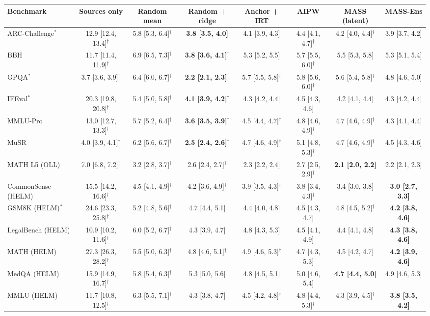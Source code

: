 \begin{tabular}{lccccccc}
\toprule
Benchmark & Sources only & Random mean & Random + ridge & Anchor + IRT & AIPW & MASS (latent) & MASS-Ens \\
\midrule
ARC-Challenge$^*$ & 12.9 [12.4, 13.4]$^\dagger$ & 5.8 [5.3, 6.4]$^\dagger$ & \textbf{3.8 [3.5, 4.0]} & 4.1 [3.9, 4.3] & 4.4 [4.1, 4.7]$^\dagger$ & 4.2 [4.0, 4.4]$^\dagger$ & 3.9 [3.7, 4.2] \\
BBH & 11.7 [11.4, 11.9]$^\dagger$ & 6.9 [6.5, 7.3]$^\dagger$ & \textbf{3.8 [3.6, 4.1]$^\dagger$} & 5.3 [5.2, 5.5] & 5.7 [5.5, 6.0]$^\dagger$ & 5.5 [5.3, 5.8] & 5.3 [5.1, 5.4] \\
GPQA$^*$ & 3.7 [3.6, 3.9]$^\dagger$ & 6.4 [6.0, 6.7]$^\dagger$ & \textbf{2.2 [2.1, 2.3]$^\dagger$} & 5.7 [5.5, 5.8]$^\dagger$ & 5.8 [5.6, 6.0]$^\dagger$ & 5.6 [5.4, 5.8]$^\dagger$ & 4.8 [4.6, 5.0] \\
IFEval$^*$ & 20.3 [19.8, 20.8]$^\dagger$ & 5.4 [5.0, 5.8]$^\dagger$ & \textbf{4.1 [3.9, 4.2]$^\dagger$} & 4.3 [4.2, 4.4] & 4.5 [4.3, 4.6] & 4.2 [4.1, 4.4] & 4.3 [4.2, 4.4] \\
MMLU-Pro & 13.0 [12.7, 13.3]$^\dagger$ & 5.7 [5.2, 6.4]$^\dagger$ & \textbf{3.6 [3.5, 3.9]$^\dagger$} & 4.5 [4.4, 4.7]$^\dagger$ & 4.8 [4.6, 4.9]$^\dagger$ & 4.7 [4.6, 4.9]$^\dagger$ & 4.3 [4.1, 4.4] \\
MuSR & 4.0 [3.9, 4.1]$^\dagger$ & 6.2 [5.6, 6.7]$^\dagger$ & \textbf{2.5 [2.4, 2.6]$^\dagger$} & 4.7 [4.6, 4.9]$^\dagger$ & 5.1 [4.8, 5.3]$^\dagger$ & 4.7 [4.6, 4.9]$^\dagger$ & 4.5 [4.3, 4.6] \\
MATH L5 (OLL) & 7.0 [6.8, 7.2]$^\dagger$ & 3.2 [2.8, 3.7]$^\dagger$ & 2.6 [2.4, 2.7]$^\dagger$ & 2.3 [2.2, 2.4] & 2.7 [2.5, 2.9]$^\dagger$ & \textbf{2.1 [2.0, 2.2]} & 2.2 [2.1, 2.3] \\
CommonSense (HELM) & 15.5 [14.2, 16.6]$^\dagger$ & 4.5 [4.1, 4.9]$^\dagger$ & 4.2 [3.6, 4.9]$^\dagger$ & 3.9 [3.5, 4.3]$^\dagger$ & 3.8 [3.4, 4.3]$^\dagger$ & 3.4 [3.0, 3.8] & \textbf{3.0 [2.7, 3.3]} \\
GSM8K (HELM)$^*$ & 24.6 [23.3, 25.8]$^\dagger$ & 5.2 [4.8, 5.6]$^\dagger$ & 4.7 [4.4, 5.1] & 4.4 [4.0, 4.8] & 4.5 [4.3, 4.7] & 4.8 [4.5, 5.2]$^\dagger$ & \textbf{4.2 [3.8, 4.6]} \\
LegalBench (HELM) & 10.9 [10.2, 11.6]$^\dagger$ & 6.0 [5.2, 6.7]$^\dagger$ & 4.3 [3.9, 4.7] & 4.8 [4.3, 5.3] & 4.5 [4.1, 4.9] & 4.4 [4.1, 4.8] & \textbf{4.3 [3.8, 4.6]} \\
MATH (HELM) & 27.3 [26.3, 28.2]$^\dagger$ & 5.5 [5.0, 6.3]$^\dagger$ & 4.8 [4.6, 5.1]$^\dagger$ & 4.9 [4.6, 5.3]$^\dagger$ & 4.7 [4.3, 5.3] & 4.5 [4.2, 4.7] & \textbf{4.2 [3.9, 4.6]} \\
MedQA (HELM) & 15.9 [14.9, 16.7]$^\dagger$ & 5.8 [5.4, 6.3]$^\dagger$ & 5.3 [5.0, 5.6] & 4.8 [4.5, 5.1] & 5.0 [4.6, 5.4] & \textbf{4.7 [4.4, 5.0]} & 4.9 [4.6, 5.3] \\
MMLU (HELM) & 11.7 [10.8, 12.5]$^\dagger$ & 6.3 [5.5, 7.1]$^\dagger$ & 4.3 [3.8, 4.7] & 4.5 [4.2, 4.8]$^\dagger$ & 4.8 [4.4, 5.3]$^\dagger$ & 4.3 [3.9, 4.5]$^\dagger$ & \textbf{3.8 [3.5, 4.2]} \\
\bottomrule
\end{tabular}
